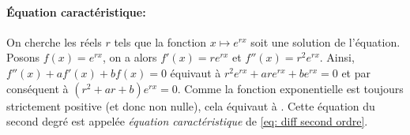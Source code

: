             \paragraph{\'Equation caract\'eristique:}
	                  On cherche les r\'eels $r$ tels que la fonction $x \mapsto e^{rx}$ soit une solution de l'\'equation.
                  Posons $f(x) = e^{r x}$, on a alors $f'(x) = r e^{rx}$ et $f''(x) = r^2 e^{rx}$.
                  Ainsi, $f''(x) + a f'(x) + b f(x) = 0$ \'equivaut \`a
                  $r^2 e^{rx} + a r e^{rx} + b e^{r x} = 0$ et par cons\'equent \`a $(r^2 + a r + b) e^{r x} = 0$.
	                  Comme la fonction exponentielle est toujours strictement positive (et donc non nulle),
                  cela \'equivaut \`a .
                  Cette \'equation du second degr\'e est appel\'ee \emph{\'equation caract\'eristique} de \eqref{eq: diff second ordre}.
